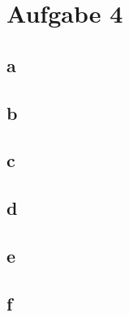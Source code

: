 
\section{Aufgabe 4}
\subsection{a}

\subsection{b}

\subsection{c}

\subsection{d}

\subsection{e}

\subsection{f}

